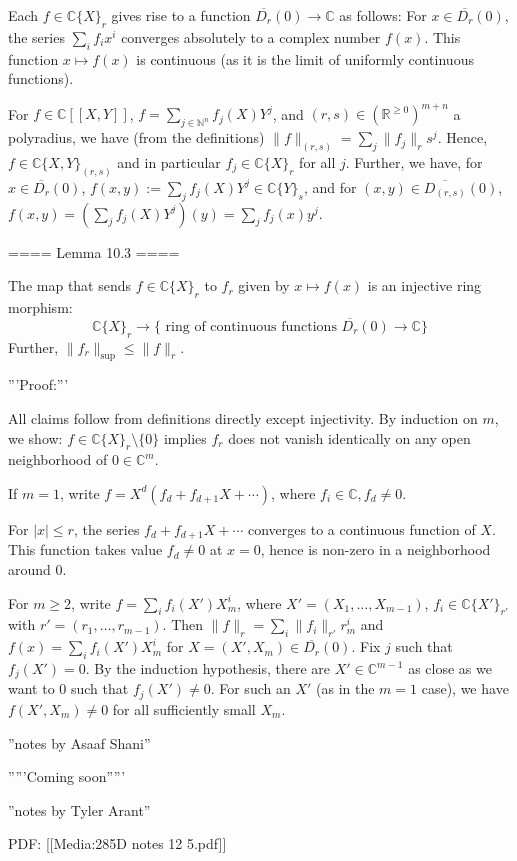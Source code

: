 Each $f\in\mathbb{C}\{X\}_r$ gives rise to a function $\overline{D_r}(0)\rightarrow\mathbb{C}$ as follows:
For $x\in\overline{D_r}(0)$, the series $\sum_i f_i x^i$ converges absolutely to a complex number $f(x)$.
This function $x\mapsto f(x)$ is continuous (as it is the limit of uniformly continuous functions).

For $f\in \mathbb{C}[[X,Y]]$, $f = \sum_{j\in \mathbb{N}^n} f_j(X) Y^j$, 
and $(r,s)\in (\mathbb{R}^{\geq 0})^{m+n}$ a polyradius, we have (from the definitions)
$\|f\|_{(r,s)} = \sum_j \|f_j\|_r s^j$.
Hence, $f\in \mathbb{C}\{X,Y\}_{(r,s)}$ and in particular $f_j\in \mathbb{C}\{X\}_r$ for all $j$.
Further, we have,
for $x\in \overline{D_r}(0)$, $f(x,y):= \sum_j f_j(X)Y^j\in \mathbb{C}\{Y\}_s$,
and for $(x,y)\in \overline{D_{(r,s)}}(0)$, $f(x,y) = \left( \sum_j f_j(X)Y^j\right)(y) = \sum_j f_j(x)y^j$.

==== Lemma 10.3 ====

The map that sends $f\in \mathbb{C}\{X\}_r$ to $f_r$ given by $x\mapsto f(x)$ is an injective ring morphism:
$$\mathbb{C}\{X\}_r \rightarrow \{\textrm{ ring of continuous functions } \overline{D_r}(0) \rightarrow \mathbb{C}\}$$
Further, $\|f_r\|_{\mathrm{sup}} \leq \|f\|_r$.

'''Proof:'''

All claims follow from definitions directly except injectivity. By induction on $m$, we show:
$f\in \mathbb{C}\{X\}_r\setminus \{0\}$ implies $f_r$ does not vanish identically on any open neighborhood of $0\in \mathbb{C}^m$.

If $m=1$, write $f = X^d (f_d + f_{d+1} X + \cdots )$, where $f_i\in \mathbb{C}, f_d\neq 0$.

For $|x|\leq r$, the series $f_d + f_{d+1}X + \cdots $ converges to a continuous function of $X$.
This function takes value $f_d\neq 0$ at $x=0$, hence is non-zero in a neighborhood around $0$.

For $m\geq 2$, write $f = \sum_i f_i(X') X_m^i$, where $X' = (X_1,\ldots, X_{m-1})$, $f_i \in \mathbb{C}\{X'\}_{r'}$
with $r' = (r_1,\ldots, r_{m-1})$.
Then $\|f\|_r = \sum_i \|f_i\|_{r'} r_m^i$ and $f(x) = \sum_i f_i(X')X_m^i$ for $X = (X',X_m)\in \overline{D_r}(0)$.
Fix $j$ such that $f_j(X') = 0$. By the induction hypothesis, there are $X'\in \mathbb{C}^{m-1}$ as close as we want to $0$
such that $f_j(X')\neq 0$. For such an $X'$ (as in the $m=1$ case), we have $f(X',X_m)\neq 0$ for all sufficiently small $X_m$.

''notes by Asaaf Shani''

'''''Coming soon'''''

''notes by Tyler Arant''

PDF: [[Media:285D notes 12 5.pdf]]
